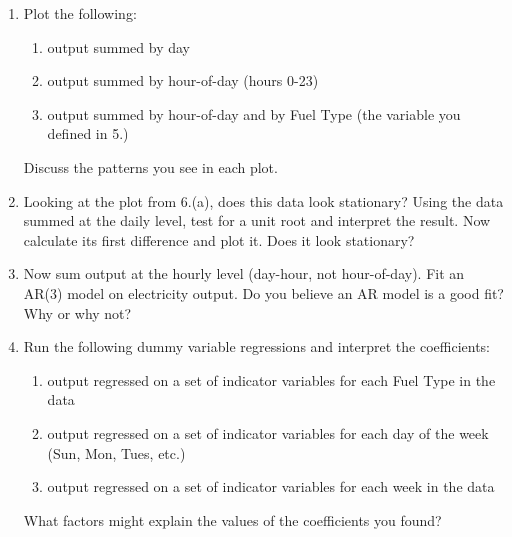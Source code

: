 \documentclass{article}
\begin{document}
\begin{enumerate}
\begin{itemize}
\item DSL - Other
\item SCGT90 - Natural Gas
\item WIND - Wind
\item PWRSTR - Other
\item HYDRO - Other
\item CCGT90 - Natural Gas
\item PVGR - Solar
\item SCLE90 - Natural Gas
\item GSREH - Natural Gas
\item CCLE90 - Natural Gas
\item CLLIG - Coal 
\item GSSUP - Natural Gas
\item NUC - Nuclear
\item GSNONR - Natural Gas
\item  RENEW - Other
\end{itemize}
\item Plot the following:
\begin{enumerate}
\item output summed by day
\item output summed by hour-of-day (hours 0-23)
\item output summed by hour-of-day and by Fuel Type (the variable you defined in 5.)
\end{enumerate}
Discuss the patterns you see in each plot.
\item Looking at the plot from 6.(a), does this data look stationary? Using the data summed at the daily level, test for a unit root and interpret the result. Now calculate its first difference and plot it. Does it look stationary?
\item Now sum output at the hourly level (day-hour, not hour-of-day). Fit an AR(3) model on electricity output. Do you believe an AR model is a good fit? Why or why not?
\item Run the following dummy variable regressions and interpret the coefficients:
\begin{enumerate}
\item output regressed on a set of indicator variables for each Fuel Type in the data
\item output regressed on a set of indicator variables for each day of the week (Sun, Mon, Tues, etc.)
\item output regressed on a set of indicator variables for each week in the data
\end{enumerate}
What factors might explain the values of the coefficients you found?
\end{enumerate}
\end{document}
